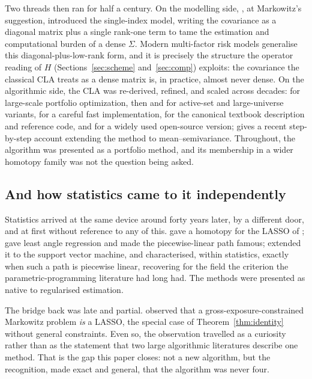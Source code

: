\documentclass[sts]{imsart}
\newcommand{\Sig}{\Sigma}
\theoremstyle{plain}
\theoremstyle{definition}
\begin{document}
Two threads then ran for half a century. On the modelling side, \citet{sharpe1963}, at
Markowitz's suggestion, introduced the single-index model, writing the covariance as a
diagonal matrix plus a single rank-one term to tame the estimation and computational
burden of a dense $\Sig$. Modern multi-factor risk models generalise this
diagonal-plus-low-rank form, and it is precisely the structure the operator reading of
$H$ (Sections~\ref{sec:scheme} and~\ref{sec:comp}) exploits: the covariance the
classical CLA treats as a dense matrix is, in practice, almost never dense. On the
algorithmic side, the CLA was re-derived, refined, and scaled across decades:
\citet{perold1984} for large-scale portfolio optimization, then \citet{stein2008} and
\citet{hirschberger2010} for active-set and large-universe variants,
\citet{niedermayer2010} for a careful fast implementation, \citet{markowitz2000} for
the canonical textbook description and reference code, and \citet{bailey2013} for a
widely used open-source version; \citet{markowitz2021} gives a recent step-by-step
account extending the method to mean--semivariance. Throughout, the algorithm was
presented as a portfolio method, and its membership in a wider homotopy family was not
the question being asked.

\subsection{And how statistics came to it independently}
\label{sec:stats-history}

Statistics arrived at the same device around forty years later, by a different door,
and at first without reference to any of this. \citet{osborne2000} gave a homotopy for
the LASSO of \citet{tibshirani1996}; \citet{efron2004} gave least angle regression and
made the piecewise-linear path famous; \citet{hastie2004svm} extended it to the support
vector machine, and \citet{rosset2007} characterised, within statistics, exactly when
such a path is piecewise linear, recovering for the field the criterion the
parametric-programming literature had long had. The methods were presented as native to
regularised estimation.

The bridge back was late and partial. \citet{brodie2009} observed that a
gross-exposure-constrained Markowitz problem \emph{is} a LASSO, the special case of
Theorem~\ref{thm:identity} without general constraints. Even so, the observation
travelled as a curiosity rather than as the statement that two large algorithmic
literatures describe one method. That is the gap this paper closes: not a new
algorithm, but the recognition, made exact and general, that the algorithm was never
four.
\end{document}
